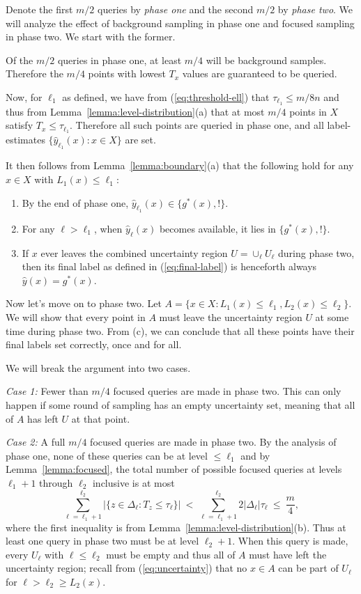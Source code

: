 \documentclass{article}
\def\yh{{\widehat{y}}}
\begin{document}
Denote the first $m/2$ queries by {\it phase one} and the second $m/2$ by {\it phase two}. We will analyze the effect of background sampling in phase one and focused sampling in phase two. We start with the former.

Of the $m/2$ queries in phase one, at least $m/4$ will be background samples. Therefore the $m/4$ points with lowest $T_x$ values are guaranteed to be queried.

Now, for $\ell_1$ as defined, we have from (\ref{eq:threshold-ell}) that $\tau_{\ell_1} \leq m/8n$ and thus from Lemma~\ref{lemma:level-distribution}(a) that at most $m/4$ points in $X$ satisfy $T_x \leq \tau_{\ell_1}$. Therefore all such points are queried in phase one, and all label-estimates $\{\yh_{\ell_1}(x): x \in X\}$ are set.

It then follows from Lemma~\ref{lemma:boundary}(a) that the following hold for any $x \in X$ with $L_1(x) \leq \ell_1$:
\begin{enumerate}
\item[(a)] By the end of phase one, $\yh_{\ell_1}(x) \in \{g^*(x), !\}$.
\item[(b)] For any $\ell > \ell_1$, when $\yh_\ell(x)$ becomes available, it lies in $\{g^*(x), !\}$.
\item[(c)] If $x$ ever leaves the combined uncertainty region $U = \cup_\ell U_\ell$ during phase two, then its final label as defined in (\ref{eq:final-label}) is henceforth always $\yh(x) = g^*(x)$.
\end{enumerate}

Now let's move on to phase two. Let $A = \{x \in X: L_1(x) \leq \ell_1, L_2(x) \leq \ell_2\}$. We will show that every point in $A$ must leave the uncertainty region $U$ at some time during phase two. From (c), we can conclude that all these points have their final labels set correctly, once and for all.

We will break the argument into two cases. 

{\it Case 1:} Fewer than $m/4$ focused queries are made in phase two. This can only happen if some round of sampling has an empty uncertainty set, meaning that all of $A$ has left $U$ at that point.

{\it Case 2:} A full $m/4$ focused queries are made in phase two. By the analysis of phase one, none of these queries can be at level $\leq \ell_1$ and by Lemma~\ref{lemma:focused}, the total number of possible focused queries at levels $\ell_1+1$ through $\ell_2$ inclusive is at most
$$\sum_{\ell=\ell_1+1}^{\ell_2} |\{z \in \Delta_{\ell}: T_z \leq \tau_\ell \}| 
\ < \ 
\sum_{\ell=\ell_1+1}^{\ell_2} 2 |\Delta_{\ell}| \tau_\ell
\ \leq \ 
\frac{m}{4} ,
$$
where the first inequality is from Lemma~\ref{lemma:level-distribution}(b). Thus at least one query in phase two must be at level $\ell_2 +1$. When this query is made, every $U_\ell$ with $\ell \leq \ell_2$ must be empty and thus all of $A$ must have left the uncertainty region; recall from (\ref{eq:uncertainty}) that no $x \in A$ can be part of $U_\ell$ for $\ell > \ell_2 \geq L_2(x)$. 
\end{document}
